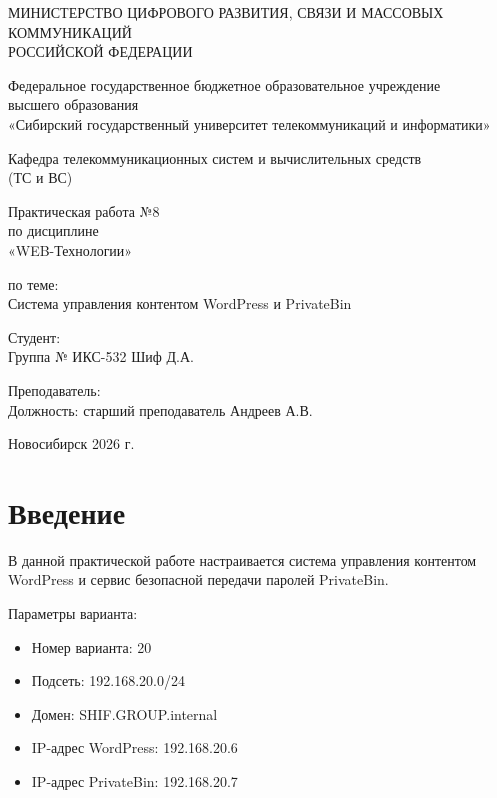 \documentclass[a4paper,14pt,oneside,openany]{memoir}
\begin{document}
\thispagestyle{empty}
\begin{center}
    МИНИСТЕРСТВО ЦИФРОВОГО РАЗВИТИЯ, СВЯЗИ И МАССОВЫХ КОММУНИКАЦИЙ \\ РОССИЙСКОЙ ФЕДЕРАЦИИ
    \vspace{15pt}

    Федеральное государственное бюджетное образовательное учреждение \\ высшего образования \\
    «Сибирский государственный университет телекоммуникаций и информатики»
    \vspace{15pt}

    Кафедра телекоммуникационных систем и вычислительных средств \\ (ТС и ВС)
\end{center}

\vfill

\begin{center}
    Практическая работа №8 \\  
    по дисциплине \\
    «WEB-Технологии»
    \vspace{15pt}

    по теме: \\
    Система управления контентом WordPress и PrivateBin
\end{center}

\vfill

\noindent Студент: \\
Группа № ИКС-532 \hfill Шиф Д.А.

\vspace{15pt}

\noindent Преподаватель: \\
Должность: старший преподаватель \hfill Андреев А.В.

\vfill

\begin{center}
    Новосибирск 2026 г.
\end{center}

\newpage
\setcounter{page}{2}
\OnehalfSpacing*

\section{Введение}
В данной практической работе настраивается система управления контентом WordPress и сервис безопасной передачи паролей PrivateBin.

Параметры варианта:
\begin{itemize}
    \item Номер варианта: 20
    \item Подсеть: 192.168.20.0/24
    \item Домен: SHIF.GROUP.internal
    \item IP-адрес WordPress: 192.168.20.6
    \item IP-адрес PrivateBin: 192.168.20.7
\end{itemize}
\end{document}
